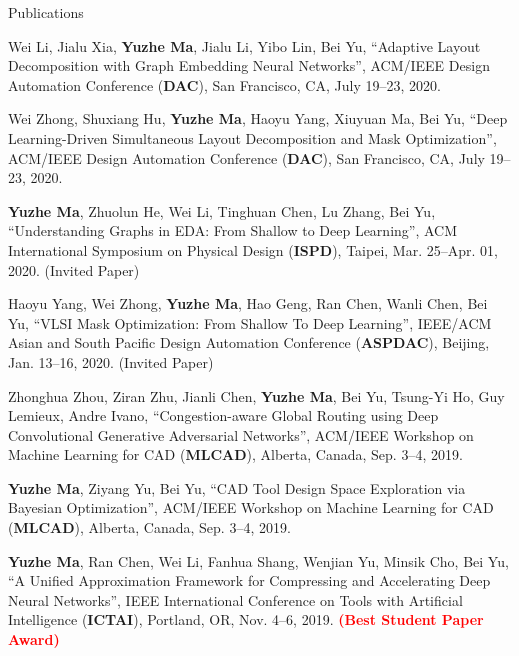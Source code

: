 \begin{rSection}{Publications}
\begin{etaremune}
\item{
        Wei Li, Jialu Xia, \textbf{Yuzhe Ma}, Jialu Li, Yibo Lin, Bei Yu,
        ``Adaptive Layout Decomposition with Graph Embedding Neural Networks'',
        ACM/IEEE Design Automation Conference (\textbf{DAC}), San Francisco, CA, July 19–23, 2020.
    }

\item{
        Wei Zhong, Shuxiang Hu, \textbf{Yuzhe Ma}, Haoyu Yang, Xiuyuan Ma, Bei Yu,
        ``Deep Learning-Driven Simultaneous Layout Decomposition and Mask Optimization'',
        ACM/IEEE Design Automation Conference (\textbf{DAC}), San Francisco, CA, July 19–23, 2020.
    }

\item{
        \textbf{Yuzhe Ma}, Zhuolun He, Wei Li, Tinghuan Chen, Lu Zhang, Bei Yu,
        ``Understanding Graphs in EDA: From Shallow to Deep Learning'',
        ACM International Symposium on Physical Design (\textbf{ISPD}), Taipei, Mar. 25–Apr. 01, 2020. (Invited Paper)
    }

\item{
        Haoyu Yang, Wei Zhong, \textbf{Yuzhe Ma}, Hao Geng, Ran Chen, Wanli Chen, Bei Yu,
        ``VLSI Mask Optimization: From Shallow To Deep Learning'',
        IEEE/ACM Asian and South Pacific Design Automation Conference (\textbf{ASPDAC}), Beijing, Jan. 13--16, 2020. (Invited Paper)
}

\item{
        Zhonghua Zhou, Ziran Zhu, Jianli Chen, \textbf{Yuzhe Ma}, Bei Yu, Tsung-Yi Ho, Guy Lemieux, Andre Ivano,
        ``Congestion-aware Global Routing using Deep Convolutional Generative Adversarial Networks'',
        ACM/IEEE Workshop on Machine Learning for CAD (\textbf{MLCAD}), Alberta, Canada, Sep. 3--4, 2019.
}

\item{
        \textbf{Yuzhe Ma}, Ziyang Yu, Bei Yu,
        ``CAD Tool Design Space Exploration via Bayesian Optimization'',
        ACM/IEEE Workshop on Machine Learning for CAD (\textbf{MLCAD}), Alberta, Canada, Sep. 3--4, 2019.
}

\item{
   \textbf{Yuzhe Ma}, Ran Chen, Wei Li, Fanhua Shang, Wenjian Yu, Minsik Cho, Bei Yu,
        ``A Unified Approximation Framework for Compressing and Accelerating Deep Neural Networks'',
        IEEE International Conference on Tools with Artificial Intelligence (\textbf{ICTAI}), Portland, OR, Nov. 4--6, 2019.
        \textcolor{red}{\textbf{(Best Student Paper Award)}}
}


\end{etaremune}
\end{rSection}

